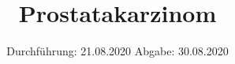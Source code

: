 

\subject{TPS Praktikum}
\title{Prostatakarzinom}
\date{%
	Durchführung: 21.08.2020
	\hspace{3em}
	Abgabe: 30.08.2020
}



\maketitle
\thispagestyle{empty}
\tableofcontents
\newpage






\newpage

\printbibliography{}


